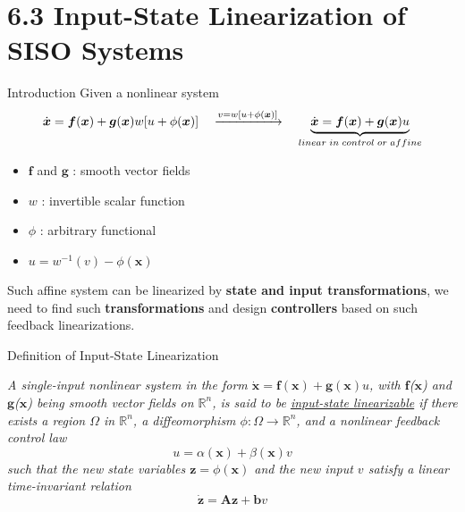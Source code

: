 \documentclass{beamer}
\renewcommand{\vec}[1]{\ensuremath{\boldsymbol{#1}}} %
\begin{document}
\section{6.3  Input-State Linearization of SISO Systems}

\begin{frame}{Introduction}
Given a nonlinear system
$$
\dot{\vec{x}}=\vec{f}(\vec{x})+\vec{g}(\vec{x})w[u+\phi(\vec{x})] \quad \xrightarrow{v=w[u+\phi(\vec{x})]} \quad \underbrace{\dot{\vec{x}}=\vec{f}(\vec{x})+\vec{g}(\vec{x})u}_{\tiny linear~in~control~or ~affine}
$$
\vspace{-20pt}
\begin{itemize}
  \item \vec{f} and \vec{g} : smooth vector fields
  \item $w$ : invertible scalar function
  \item $\phi$ : arbitrary functional
  \item $u = w^{-1}(v)-\phi(\vec{x})$
\end{itemize}
Such affine system can be linearized by \textbf{state and input transformations}, we need to find such \textbf{transformations} and design \textbf{controllers} based on such feedback linearizations.
\end{frame}


\begin{frame}{Definition of Input-State Linearization}
    \begin{definition}[6.6]
    \textit{
    A single-input nonlinear system in the form $ \dot{\vec{x}} = \vec{f}(\vec{x}) + \vec{g}(\vec{x})u $, with \vec{f}(\vec{x}) and \vec{g}(\vec{x}) being smooth vector fields on $\mathbb{R}^{n}$, is said to be \underline{input-state linearizable} if there exists a {\color{red}region $\Omega$ in $\mathbb{R}^{n}$}, a {\color{red}diffeomorphism $ \phi : \Omega \rightarrow \mathbb{R}^{n} $}, and a {\color{red}nonlinear feedback control law}
    \begin{equation}\label{affine}
      u = \alpha(\vec{x})+\beta(\vec{x})v
    \end{equation}
    such that the new state variables $\vec{z}=\phi(\vec{x})$ and the new input $v$ satisfy a linear time-invariant relation
    \begin{equation}\label{linear-relation}
      \dot{\vec{z}} = \vec{A}\vec{z}+\vec{b}v
    \end{equation}
    }
    \end{definition}
\end{frame}
\end{document}
